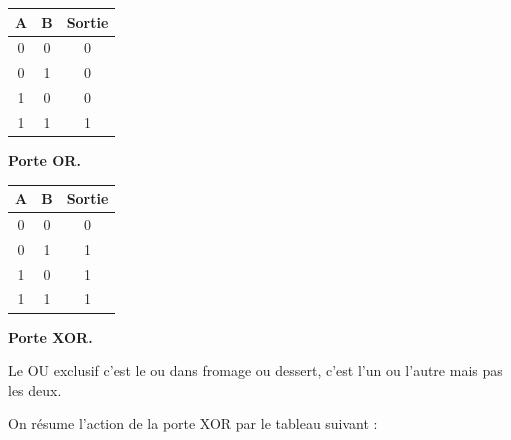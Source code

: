 \documentclass[11pt,class=report,crop=false]{standalone}
\begin{document}
\begin{center}
\begin{minipage}{0.45\textwidth}
\begin{center}
\begin{tabular}{|c|c|c|}
\hline
A & B & Sortie \\ \hline\hline
0 & 0 & 0 \\
0 & 1 & 0 \\
1 & 0 & 0 \\
1 & 1 & 1 \\ \hline
\end{tabular}
\end{center}
\end{minipage}
\begin{minipage}{0.45\textwidth}
\end{minipage}
\end{center}


\textbf{Porte OR.}


\begin{center}
\begin{minipage}{0.45\textwidth}
\begin{center}
\begin{tabular}{|c|c|c|}
\hline
A & B & Sortie \\ \hline\hline
0 & 0 & 0 \\
0 & 1 & 1 \\
1 & 0 & 1 \\
1 & 1 & 1 \\ \hline
\end{tabular}
\end{center}
\end{minipage}
\begin{minipage}{0.45\textwidth}
\end{minipage}
\end{center}


\textbf{Porte XOR.}

Le \og{}OU exclusif\fg{} c'est le \og{}ou\fg{} dans \og{}fromage ou dessert\fg{}, c'est l'un ou l'autre mais pas les deux.


On résume l'action de la porte XOR par le tableau suivant :
\end{document}
